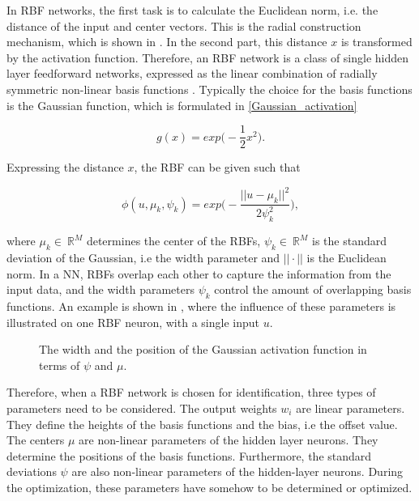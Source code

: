  In RBF networks, the first task is to calculate the Euclidean norm, i.e. the distance of the input and center vectors. This is the radial construction mechanism, which is shown in . In the second part, this distance $x$ is transformed by the activation function. Therefore, an RBF network is a class of single hidden layer feedforward networks, expressed as the linear combination of radially symmetric non-linear basis functions \cite{RBF_article}. Typically the choice for the basis functions is the Gaussian function, which is formulated in \eqref{Gaussian_activation} 

\begin{equation}
\label{Gaussian_activation}
g(x) = exp \Big(-\frac{1}{2}x^2\Big).
\end{equation}

Expressing the distance $x$, the RBF can be given such that

 \begin{equation}
\label{Gaussian_activation1}
\phi(u,\mu_k, \psi_k) = exp \Big(-\frac{||u-\mu_k||^2}{2\psi_k^2}\Big), 
\end{equation}

where $\mu_k \in \: \mathbb{R}^{M}$ determines the center of the RBFs, $\psi_k \in \: \mathbb{R}^{M}$ is the standard deviation of the Gaussian, i.e the width parameter and $||\cdot||$ is the Euclidean norm. In a NN, RBFs overlap each other to capture the information from the input data, and the width parameters $\psi_k$ control the amount of overlapping basis functions. An example is shown in , where the influence of these parameters is illustrated on one RBF neuron, with a single input $u$. 

\begin{figure}[H]
\centering
 
\caption{The width and the position of the Gaussian activation function in terms of $\psi$ and $\mu$.}
\label{fig:rbf_pram}
\end{figure}

\vspace{-3mm}

Therefore, when a RBF network is chosen for identification, three types of parameters need to be considered. The output weights $w_i$ are linear parameters. They define the heights of the basis functions and the bias, i.e the offset value. The centers $\mu$ are non-linear parameters of the hidden layer neurons. They determine the positions of the basis functions. Furthermore, the standard deviations $\psi$ are also non-linear parameters of the hidden-layer neurons. During the optimization, these parameters have somehow to be determined or optimized. 

